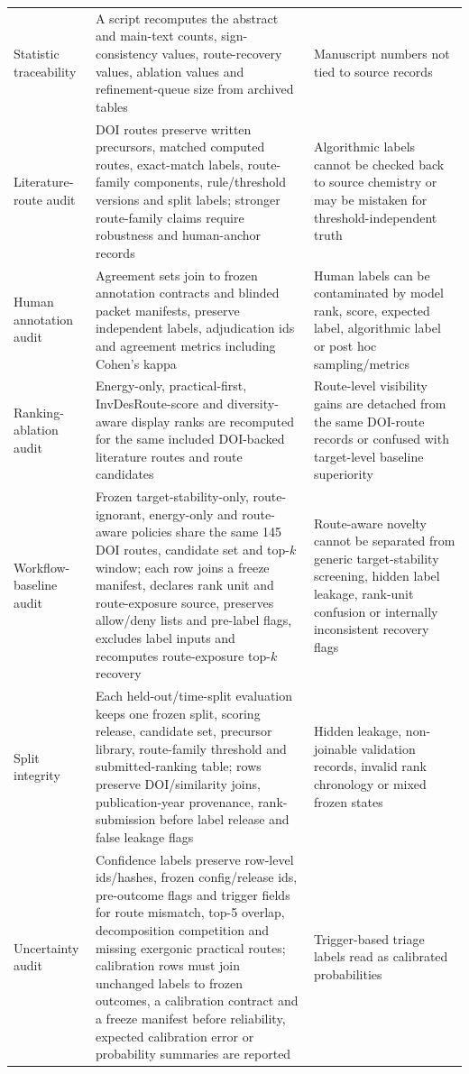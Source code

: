 \documentclass[11pt, letterpaper]{article}
\begin{document}
\begin{table}[p]
\begin{tabular}{L{0.24\textwidth}L{0.44\textwidth}L{0.22\textwidth}}
Statistic traceability & A script recomputes the abstract and main-text counts, sign-consistency values, route-recovery values, ablation values and refinement-queue size from archived tables & Manuscript numbers not tied to source records \\
Literature-route audit & DOI routes preserve written precursors, matched computed routes, exact-match labels, route-family components, rule/threshold versions and split labels; stronger route-family claims require robustness and human-anchor records & Algorithmic labels cannot be checked back to source chemistry or may be mistaken for threshold-independent truth \\
Human annotation audit & Agreement sets join to frozen annotation contracts and blinded packet manifests, preserve independent labels, adjudication ids and agreement metrics including Cohen's kappa & Human labels can be contaminated by model rank, score, expected label, algorithmic label or post hoc sampling/metrics \\
Ranking-ablation audit & Energy-only, practical-first, InvDesRoute-score and diversity-aware display ranks are recomputed for the same included DOI-backed literature routes and route candidates & Route-level visibility gains are detached from the same DOI-route records or confused with target-level baseline superiority \\
Workflow-baseline audit & Frozen target-stability-only, route-ignorant, energy-only and route-aware policies share the same 145 DOI routes, candidate set and top-$k$ window; each row joins a freeze manifest, declares rank unit and route-exposure source, preserves allow/deny lists and pre-label flags, excludes label inputs and recomputes route-exposure top-$k$ recovery & Route-aware novelty cannot be separated from generic target-stability screening, hidden label leakage, rank-unit confusion or internally inconsistent recovery flags \\
Split integrity & Each held-out/time-split evaluation keeps one frozen split, scoring release, candidate set, precursor library, route-family threshold and submitted-ranking table; rows preserve DOI/similarity joins, publication-year provenance, rank-submission before label release and false leakage flags & Hidden leakage, non-joinable validation records, invalid rank chronology or mixed frozen states \\
Uncertainty audit & Confidence labels preserve row-level ids/hashes, frozen config/release ids, pre-outcome flags and trigger fields for route mismatch, top-5 overlap, decomposition competition and missing exergonic practical routes; calibration rows must join unchanged labels to frozen outcomes, a calibration contract and a freeze manifest before reliability, expected calibration error or probability summaries are reported & Trigger-based triage labels read as calibrated probabilities \\

\end{tabular}
\end{table}
\end{document}
